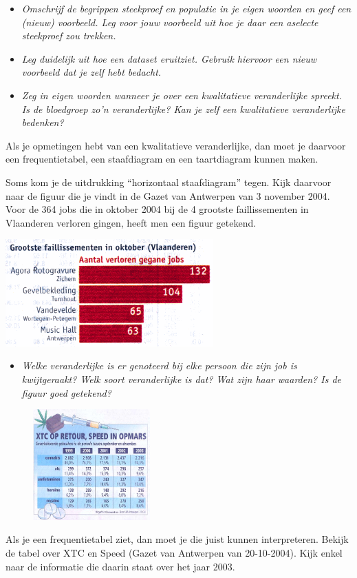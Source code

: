 \documentclass[11pt]{article}
\newcommand{\vraag}[2]{\begin{itemize}\item {\it #1} \vspace*{#2}\end{itemize}}
\begin{document}
\vraag{Omschrijf de begrippen steekproef en populatie in je eigen woorden en geef een (nieuw)
voorbeeld. Leg voor jouw voorbeeld uit hoe je daar een aselecte steekproef zou
trekken.}{3cm}

\vraag{Leg duidelijk uit hoe een dataset eruitziet. Gebruik hiervoor een nieuw voorbeeld dat je zelf
hebt bedacht.}{3cm}

\vraag{Zeg in eigen woorden wanneer je over een kwalitatieve veranderlijke spreekt. Is de bloedgroep zo’n veranderlijke? Kan je zelf een kwalitatieve veranderlijke bedenken?}{3cm}

Als je opmetingen hebt van een kwalitatieve veranderlijke, dan moet je daarvoor
een frequentietabel, een staafdiagram en een taartdiagram kunnen maken.

Soms kom je de uitdrukking “horizontaal staafdiagram” tegen. Kijk daarvoor naar de figuur
die je vindt in de Gazet van Antwerpen van 3 november 2004. Voor de 364 jobs die in
oktober 2004 bij de 4 grootste faillissementen in Vlaanderen verloren gingen, heeft men een
figuur getekend.

\begin{center}
  \includegraphics[width=0.6\textwidth]{horizontaal_staafdiagram-faillissementen}
\end{center}

\vraag{Welke veranderlijke is er genoteerd bij elke persoon die zijn job is
kwijtgeraakt? Welk soort veranderlijke is dat? Wat zijn haar waarden? Is de figuur goed
getekend?}{3cm}

\begin{figure}
  \vspace*{-1cm}
  \includegraphics[width=0.4\textwidth]{tabel-drugs}
\end{figure}
Als je een frequentietabel ziet, dan moet je die juist kunnen interpreteren. Bekijk de tabel over XTC en Speed (Gazet van Antwerpen van 20-10-2004). Kijk enkel naar de informatie die daarin staat over het
jaar 2003.
\end{document}
